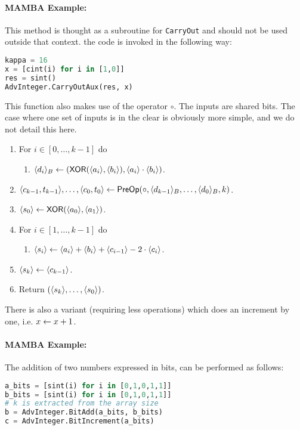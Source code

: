 \paragraph{MAMBA Example:} This method is thought as a subroutine for \verb|CarryOut| and should not be used outside that context. the code is invoked in the following way: 
\begin{lstlisting}[language={python}]
kappa = 16
x = [cint(i) for i in [1,0]]
res = sint()
AdvInteger.CarryOutAux(res, x)
\end{lstlisting}


This function also makes use of the operator $\circ$.
The inputs are shared bits. The case where one set of inputs is in the clear
is obviously more simple, and we do not detail this here.
\begin{enumerate}
\item For $i \in [0,\ldots,k-1]$ do
\begin{enumerate}
\item $\langle d_i \rangle_B \leftarrow (\mathsf{XOR}(\langle a_i \rangle, \langle b_i \rangle),
	                    \langle a_i \rangle\cdot \langle b_i \rangle)$.
\end{enumerate}
\item $\langle c_{k-1},t_{k-1} \rangle,\ldots,\langle c_0,t_0 \rangle  \leftarrow \mathsf{PreOp}(\circ,\langle d_{k-1} \rangle_B,\ldots,\langle d_0 \rangle_B,k)$.
\item $\langle s_0 \rangle \leftarrow \mathsf{XOR}(\langle a_0 \rangle, \langle a_1 \rangle)$.
\item For $i \in [1,\ldots,k-1]$ do
\begin{enumerate}
  \item $\langle s_i \rangle \leftarrow \langle a_i \rangle+\langle b_i \rangle+\langle c_{i-1} \rangle-2\cdot \langle c_i \rangle$.
\end{enumerate}
\item $\langle s_k \rangle \leftarrow \langle c_{k-1} \rangle$.
\item Return $(\langle s_k \rangle,\ldots,\langle s_0 \rangle)$.
\end{enumerate}
There is also a variant (requiring less operations) which does an increment
by one, i.e. $x \leftarrow x+1$.

\paragraph{MAMBA Example:} The addition of two numbers expressed in bits, can be performed as follows: 
\begin{lstlisting}[language={python}]
a_bits = [sint(i) for i in [0,1,0,1,1]]
b_bits = [sint(i) for i in [0,1,0,1,1]]
# k is extracted from the array size
b = AdvInteger.BitAdd(a_bits, b_bits)
c = AdvInteger.BitIncrement(a_bits)
\end{lstlisting}

